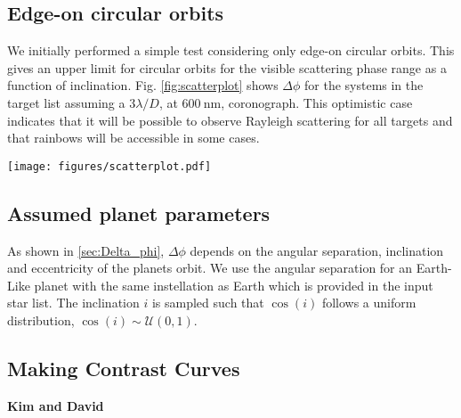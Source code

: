 \documentclass[
    usenatbib,
]{mnras}
\begin{document}
\subsection{Edge-on circular orbits}
\label{sec:edge-on}
We initially performed a simple test considering only edge-on circular orbits. This gives an upper limit for circular orbits for the visible scattering phase range as a function of inclination. Fig. \ref{fig:scatterplot} shows $\Delta \phi$ for the systems in the target list assuming a $3 \lambda / D$, at $\SI{600}{\nano\meter}$, coronograph. This optimistic case indicates that it will be possible to observe Rayleigh scattering for all targets and that rainbows will be accessible in some cases.

\begin{figure*}
    \centering
    \texttt{[image: figures/scatterplot.pdf]}
    \caption{
        Scatter plot at 3 $\lambda/D$ for the target sample showing stellar effective temperature and stellar distance. 
        The size of the points represents the angular separation of the star and planet in milliarcseconds as presented in the target list. The colour of the points shows the atmospheric phenomenon that can be detected with darker colors including all lighter (yellow) color phenomenon. Thus dark blue points are systems which have the most key features, as systems in which the angles required to see the rainbow are probed will also have the angles required to see the Rayleigh scattering probed.
    }
    \label{fig:scatterplot}
\end{figure*}

\subsection{Assumed planet parameters}

As shown in \cref{sec:Delta_phi}, $\Delta \phi$ depends on the angular separation, inclination and eccentricity of the planets orbit. 
We use the angular separation for an Earth-Like planet with the same instellation as Earth which is provided in the input star list. 
The inclination $i$ is sampled such that $\cos(i)$ follows a uniform distribution, $\cos(i) \sim \mathcal{U}(0, 1)$.

\subsection{Making Contrast Curves}
\textbf{Kim and David}
%
\end{document}
